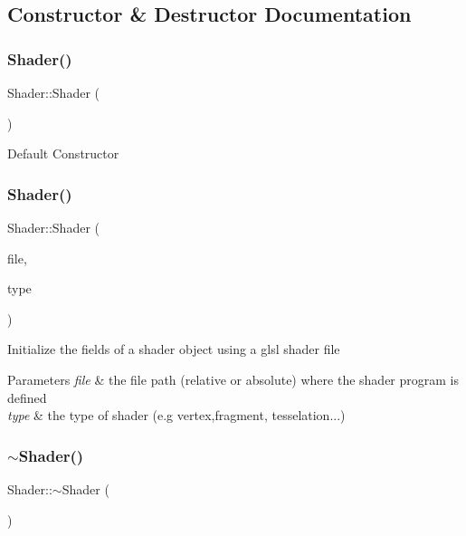 \subsection{Constructor \& Destructor Documentation}
\mbox{\label{classShader_a0d654ebaca4e0555197c0724c6d30610}} 
\subsubsection{\texorpdfstring{Shader()}{Shader()}\hspace{0.1cm}{\footnotesize\ttfamily [1/2]}}
{\footnotesize\ttfamily Shader\+::\+Shader (\begin{DoxyParamCaption}{ }\end{DoxyParamCaption})}

Default Constructor \mbox{\label{classShader_a7933b4a0a4d8446c8df9e3c6118a80bf}} 
\subsubsection{\texorpdfstring{Shader()}{Shader()}\hspace{0.1cm}{\footnotesize\ttfamily [2/2]}}
{\footnotesize\ttfamily Shader\+::\+Shader (\begin{DoxyParamCaption}\item[{string}]{file,  }\item[{G\+Lenum}]{type }\end{DoxyParamCaption})}

Initialize the fields of a shader object using a glsl shader file


\begin{DoxyParams}{Parameters}
{\em file} & the file path (relative or absolute) where the shader program is defined \\
\hline
{\em type} & the type of shader (e.\+g vertex,fragment, tesselation...) \\
\hline
\end{DoxyParams}
\mbox{\label{classShader_aff01df87e8a102f270b5b135a295e59d}} 
\subsubsection{\texorpdfstring{$\sim$\+Shader()}{~Shader()}}
{\footnotesize\ttfamily Shader\+::$\sim$\+Shader (\begin{DoxyParamCaption}{ }\end{DoxyParamCaption})}

